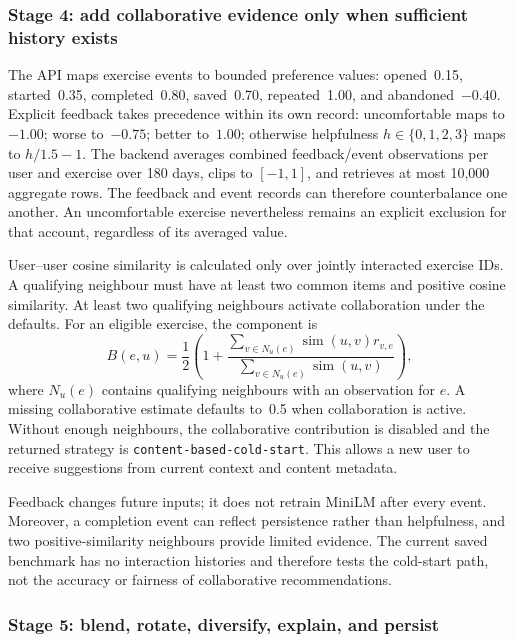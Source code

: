 \subsubsection{Stage 4: add collaborative evidence only when sufficient history exists}
\label{sec:stage-four}

The API maps exercise events to bounded preference values: opened~0.15, started~0.35, completed~0.80, saved~0.70, repeated~1.00, and abandoned~$-0.40$. Explicit feedback takes precedence within its own record: uncomfortable maps to~$-1.00$; worse to~$-0.75$; better to~$1.00$; otherwise helpfulness $h\in\{0,1,2,3\}$ maps to $h/1.5-1$. The backend averages combined feedback/event observations per user and exercise over 180 days, clips to $[-1,1]$, and retrieves at most 10,000 aggregate rows. The feedback and event records can therefore counterbalance one another. An uncomfortable exercise nevertheless remains an explicit exclusion for that account, regardless of its averaged value.

User--user cosine similarity is calculated only over jointly interacted exercise IDs. A qualifying neighbour must have at least two common items and positive cosine similarity. At least two qualifying neighbours activate collaboration under the defaults. For an eligible exercise, the component is
\begin{equation}
 B(e,u)=\frac{1}{2}\left(1+\frac{\sum_{v\in N_u(e)}\operatorname{sim}(u,v)r_{v,e}}{\sum_{v\in N_u(e)}\operatorname{sim}(u,v)}\right),
 \label{eq:collaborative-score}
\end{equation}
where $N_u(e)$ contains qualifying neighbours with an observation for $e$. A missing collaborative estimate defaults to~0.5 when collaboration is active. Without enough neighbours, the collaborative contribution is disabled and the returned strategy is \texttt{content-based-cold-start}. This allows a new user to receive suggestions from current context and content metadata.

Feedback changes future inputs; it does not retrain MiniLM after every event. Moreover, a completion event can reflect persistence rather than helpfulness, and two positive-similarity neighbours provide limited evidence. The current saved benchmark has no interaction histories and therefore tests the cold-start path, not the accuracy or fairness of collaborative recommendations.

\subsubsection{Stage 5: blend, rotate, diversify, explain, and persist}
\label{sec:stage-five}

